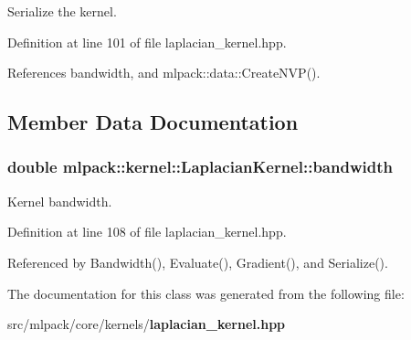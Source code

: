 Serialize the kernel. 



Definition at line 101 of file laplacian\+\_\+kernel.\+hpp.



References bandwidth, and mlpack\+::data\+::\+Create\+N\+V\+P().



\subsection{Member Data Documentation}
\subsubsection[{bandwidth}]{\setlength{\rightskip}{0pt plus 5cm}double mlpack\+::kernel\+::\+Laplacian\+Kernel\+::bandwidth\hspace{0.3cm}{\ttfamily [private]}}\label{classmlpack_1_1kernel_1_1LaplacianKernel_a82757c8572fa010b94d3c1501458a4d0}


Kernel bandwidth. 



Definition at line 108 of file laplacian\+\_\+kernel.\+hpp.



Referenced by Bandwidth(), Evaluate(), Gradient(), and Serialize().



The documentation for this class was generated from the following file\+:\begin{DoxyCompactItemize}
\item 
src/mlpack/core/kernels/{\bf laplacian\+\_\+kernel.\+hpp}\end{DoxyCompactItemize}
